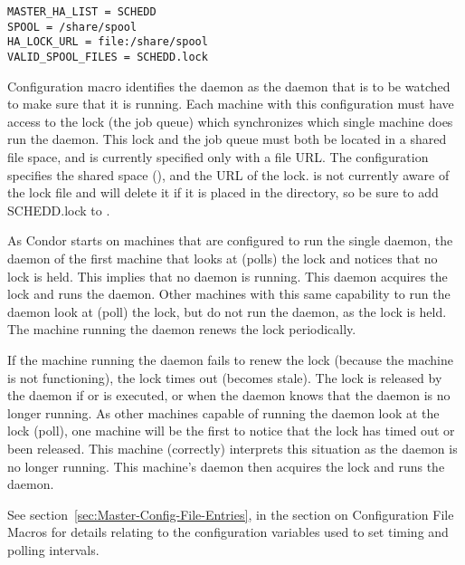 \begin{verbatim}
MASTER_HA_LIST = SCHEDD
SPOOL = /share/spool
HA_LOCK_URL = file:/share/spool
VALID_SPOOL_FILES = SCHEDD.lock
\end{verbatim}

Configuration macro  identifies the 
 daemon as the daemon that is to be watched
to make sure that it is running.
Each machine with this configuration must have access to the
lock (the job queue) which synchronizes which single machine does run the
 daemon.
This lock and the job queue must both be located in a shared file space,
and is currently specified only with a file URL.
The configuration specifies the shared space
(),
and the URL of the lock.
 is not currently aware of the lock file and will
delete it if it is placed in the  directory, so be
sure to add SCHEDD.lock to .

As Condor starts on machines that are configured to run
the single  daemon, 
the  daemon of the
first machine that looks at (polls) the lock
and notices that no lock is held.
This implies that no  daemon is running.
This  daemon acquires the lock
and runs the  daemon.
Other machines with this same capability to run the
 daemon look at (poll) the lock, 
but do not run the daemon, as the lock is held.
The machine running the  daemon renews the
lock periodically.

If the machine running the  daemon fails to renew
the lock (because the machine is not functioning),
the lock times out (becomes stale).
The lock is released by the  daemon
if  or  is
executed, or when the  daemon knows that the
 daemon is no longer running.
As other machines capable of running the  daemon
look at the lock (poll), one machine will be the first
to notice that the lock has timed out or been released.
This machine (correctly) interprets this situation as the
 daemon is no longer running.
This machine's  daemon then acquires the lock
and runs the  daemon.

See 
section~\ref{sec:Master-Config-File-Entries},
in the section on  Configuration File Macros
for details relating to the configuration variables
used to set timing and polling intervals.

